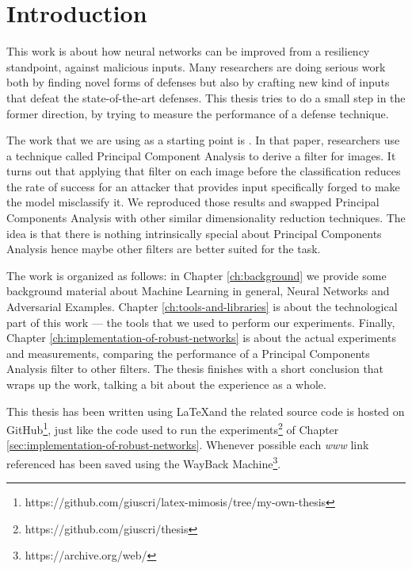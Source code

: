 \chapter*{Introduction}

This work is about how neural networks can be improved from a
resiliency standpoint, against malicious inputs. Many researchers are
doing serious work \cite{papernot2016cleverhans}
\cite{DBLP:journals/corr/KurakinGB16} \cite{carlini2017adversarial}
\cite{meng2017magnet} \cite{yuan2017adversarial} \cite{xu2017feature}
\cite{liao2018defense} both by finding novel forms of defenses but also
by crafting new kind of inputs that defeat the state-of-the-art
defenses. This thesis tries to do a small step in the former direction,
by trying to measure the performance of a defense technique.

The work that we are using as a starting point is
\cite{bhagoji2018enhancing}. In that paper, researchers use a technique
called Principal Component Analysis to derive a filter for images. It
turns out that applying that filter on each image before the
classification reduces the rate of success for an attacker that
provides input specifically forged to make the model misclassify it. We
reproduced those results and swapped Principal Components Analysis with
other similar dimensionality reduction techniques. The idea is that
there is nothing intrinsically special about Principal Components
Analysis hence maybe other filters are better suited for the task.

The work is organized as follows: in Chapter \ref{ch:background} we
provide some background material about Machine Learning in general,
Neural Networks and Adversarial Examples. Chapter
\ref{ch:tools-and-libraries} is about the technological part of this
work --- the tools that we used to perform our experiments. Finally,
Chapter \ref{ch:implementation-of-robust-networks} is about the actual
experiments and measurements, comparing the performance of a Principal
Components Analysis filter to other filters. The thesis finishes
with a short conclusion that wraps up the work, talking a bit about the
experience as a whole.

This thesis has been written using \LaTeX and the related source code
is hosted on
GitHub\footnote{https://github.com/giuscri/latex-mimosis/tree/my-own-thesis},
just like the code used to run the
experiments\footnote{https://github.com/giuscri/thesis} of Chapter
\ref{sec:implementation-of-robust-networks}. Whenever possible each
\emph{www} link referenced has been saved using the WayBack
Machine\footnote{https://archive.org/web/}.

